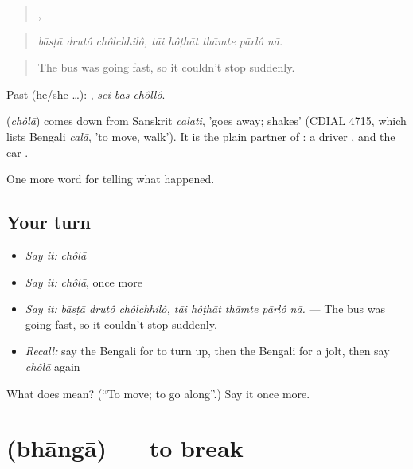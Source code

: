 \begin{quote}
  ,     
\end{quote}

\begin{quote}
\emph{bāsṭā drutô chôlchhilô, tāi hôṭhāt thāmte pārlô nā.}
\end{quote}

\begin{quote}
The bus was going fast, so it couldn't stop suddenly.
\end{quote}

Past (he/she …):   , \emph{sei bās chôllô}.

\begin{cousinweb}
\textbf{} (\emph{chôlā}) comes down from Sanskrit \emph{calati}, 'goes away; shakes' (CDIAL 4715, which lists Bengali \emph{calā}, 'to move, walk'). It is the plain partner of \textbf{}: a driver , and the car .
\end{cousinweb}

\begin{grammarlens}[title={What you've built}]
One more word for telling what happened.
\end{grammarlens}

\subsection*{Your turn}
\begin{itemize}
\raggedright
  \item \emph{Say it:} \emph{chôlā}
  \item \emph{Say it:} \emph{chôlā}, once more
  \item \emph{Say it:} \emph{bāsṭā drutô chôlchhilô, tāi hôṭhāt thāmte pārlô nā.} — The bus was going fast, so it couldn't stop suddenly.
  \item \emph{Recall:} say the Bengali for to turn up, then the Bengali for a jolt, then say \emph{chôlā} again
\end{itemize}

\begin{tcolorbox}[breakable,colback=teal!4,colframe=teal!35!black,title={Before you move on}]
What does  mean? (\textquotedblleft{}To move; to go along\textquotedblright{}.) Say it once more.
\end{tcolorbox}
\section[\texorpdfstring{\bn{ভাঙা} (bhāngā)}{ভাঙা (bhāngā)}]{ (bhāngā) — to break}

